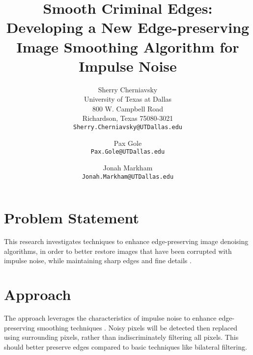 \documentclass[10pt,twocolumn,letterpaper]{article}
\begin{document}
    \title{Smooth Criminal Edges: Developing a New Edge-preserving Image Smoothing Algorithm for Impulse Noise}

    \author{Sherry Cherniavsky\\
    University of Texas at Dallas\\
    800 W. Campbell Road\\
    Richardson, Texas 75080-3021\\
    {\tt\small Sherry.Cherniavsky@UTDallas.edu}
    \and
    Pax Gole\\
    {\tt\small Pax.Gole@UTDallas.edu}
    \and
    Jonah Markham\\
    {\tt\small Jonah.Markham@UTDallas.edu}
    }
    \maketitle


    \section{Problem Statement}
    This research investigates techniques to enhance edge-preserving image
    denoising algorithms, in order to better restore images that have been
    corrupted with impulse noise, while maintaining sharp edges and fine details \cite{chan2005, huang2021, chan2005-2, zhang2015}.

    \section{Approach}
    The approach leverages the characteristics of impulse noise to enhance
    edge-preserving smoothing techniques \cite{nikolova2004, abreu1996}. Noisy pixels will be detected then
    replaced using surrounding pixels, rather than indiscriminately filtering
    all pixels. This should better preserve edges compared to basic techniques
    like bilateral filtering.
\end{document}
